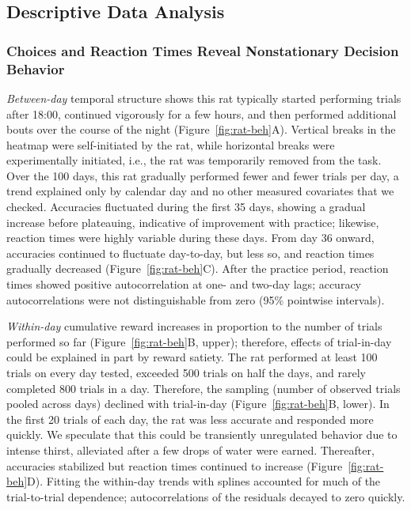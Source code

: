 \documentclass[00-main.tex]{subfiles}
\begin{document}
\newpage

\subsection{Descriptive Data Analysis}
\subsubsection{Choices and Reaction Times Reveal Nonstationary Decision Behavior}
\emph{Between-day} temporal structure shows this rat typically started performing trials after 18:00, continued vigorously for a few hours, and then performed additional bouts over the course of the night (Figure~\ref{fig:rat-beh}A). Vertical breaks in the heatmap were self-initiated by the rat, while horizontal breaks were experimentally initiated, i.e., the rat was temporarily removed from the task. Over the 100 days, this rat gradually performed fewer and fewer trials per day, a trend explained only by calendar day and no other measured covariates that we checked. Accuracies fluctuated during the first 35 days, showing a gradual increase before plateauing, indicative of improvement with practice; likewise, reaction times were highly variable during these days. From day 36 onward, accuracies continued to fluctuate day-to-day, but less so, and reaction times gradually decreased (Figure~\ref{fig:rat-beh}C). After the practice period, reaction times showed positive autocorrelation at one- and two-day lags; accuracy autocorrelations were not distinguishable from zero (95\% pointwise intervals).

\emph{Within-day} cumulative reward increases in proportion to the number of trials performed so far (Figure~\ref{fig:rat-beh}B, upper); therefore, effects of trial-in-day could be explained in part by reward satiety. The rat performed at least 100 trials on every day tested, exceeded 500 trials on half the days, and rarely completed 800 trials in a day. Therefore, the sampling (number of observed trials pooled across days) declined with trial-in-day (Figure~\ref{fig:rat-beh}B, lower). In the first 20 trials of each day, the rat was less accurate and responded more quickly. We speculate that this could be transiently unregulated behavior due to intense thirst, alleviated after a few drops of water were earned. Thereafter, accuracies stabilized but reaction times continued to increase (Figure~\ref{fig:rat-beh}D). Fitting the within-day trends with splines accounted for much of the trial-to-trial dependence; autocorrelations of the residuals decayed to zero quickly.
\end{document}
